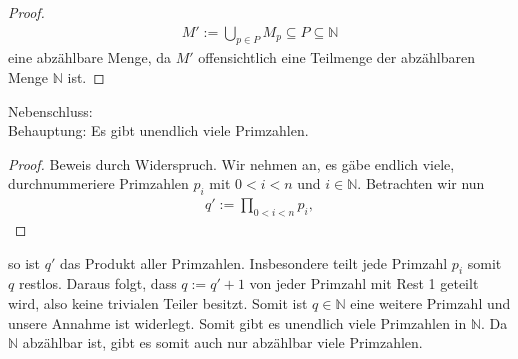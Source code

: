 \documentclass{scrreprt}
\newcommand{\NN}{\mathbb{N}}
\begin{document}
\begin{enumerate}[(a)]
\begin{proof}
				\begin{align*}
					M' := \bigcup\limits_{p \in P} M_p \subseteq P \subseteq \NN
				\end{align*}
				eine abzählbare Menge, da $M'$ offensichtlich eine Teilmenge der abzählbaren Menge $\NN$ ist.
			\end{proof}
	\end{enumerate}
	\pagebreak
	Nebenschluss:\\
	Behauptung: Es gibt unendlich viele Primzahlen.
	\begin{proof}
		Beweis durch Widerspruch. Wir nehmen an, es gäbe endlich viele, durchnummeriere Primzahlen $p_i$ mit $0 < i < n$ und $i \in \NN$. Betrachten wir nun
		\begin{align*}
			q' := \prod\limits_{0 < i < n} p_i,
		\end{align*}
	\end{proof}
	so ist $q'$ das Produkt aller Primzahlen. Insbesondere teilt jede Primzahl $p_i$ somit $q$ restlos. Daraus folgt, dass $q := q' + 1$ von jeder Primzahl mit Rest 1 geteilt wird, also keine trivialen Teiler besitzt. Somit ist $q \in \NN$ eine weitere Primzahl und unsere Annahme ist widerlegt. Somit gibt es unendlich viele Primzahlen in $\NN$. Da $\NN$ abzählbar ist, gibt es somit auch nur abzählbar viele Primzahlen.
		
\end{document}

